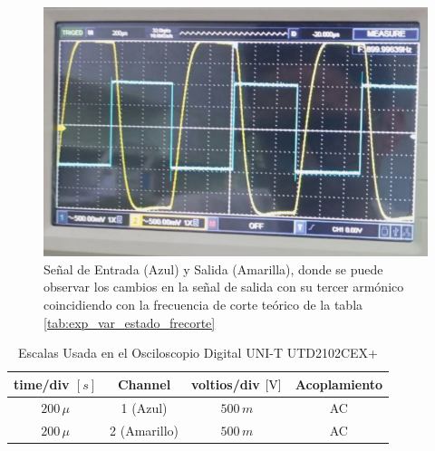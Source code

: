 \begin{itemize}
\begin{itemize}
                     \begin{figure}[H]
                        \centering
                        \renewcommand{\figurename}{Imagen}
                        \setcounter{figure}{13}
                        \includegraphics[width=15cm]{Imagenes/armonico_var_estado.png}
                        \caption{Señal de Entrada (Azul) y Salida (Amarilla), donde se puede observar los cambios en la señal de salida con su tercer armónico coincidiendo con la frecuencia de corte teórico de la tabla \ref{tab:exp_var_estado_frecorte}}
                        \label{fig:armonico_var_estado}
                    \end{figure}
            
                    \begin{table}[H]
                        \centering
                        \begin{tabular}{|c|c|c|c|}
                            \hline
                            \textbf{time/div} $[s]$ & \textbf{Channel} & \textbf{voltios/div $[\volt]$} & \textbf{Acoplamiento} \\ \hline
                            $200 \, \mu$ & 1 (Azul) &  $500 \, m $ & AC \\ \hline
                            $200 \, \mu$ & 2 (Amarillo)  &   $500 \, m $ & AC \\ \hline  
                        \end{tabular}
                        \caption{Escalas Usada en el Osciloscopio Digital UNI-T UTD2102CEX+}
                        \label{tab:escala_exp_var_estado_armonico}
                    \end{table}
            \end{itemize}


\end{itemize}

